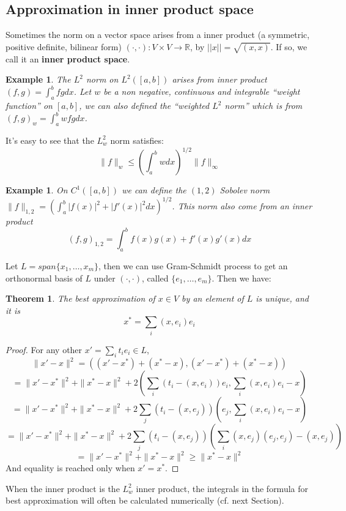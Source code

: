 \documentclass{article} %
\theoremstyle{break}
\newtheorem{exa}[definition]{Example}
\newtheorem{thm}[definition]{Theorem}
\begin{document}
\subsection{Approximation in inner product space}

Sometimes the norm on a vector space arises from a inner product (a symmetric, positive definite, bilinear form) $(\cdot, \cdot): V\times V\rightarrow \mathbb{R}$, by $||x||=\sqrt{(x, x)}$. If so, we call it an {\bf inner product space}.\\

\begin{exa}The $L^2$ norm on $L^2([a, b])$ arises from inner product $(f, g)=\int_a^b fg dx$. Let $w$ be a non negative, continuous and integrable ``weight function'' on $[a, b]$, we can also defined the ``weighted $L^2$ norm'' which is from $(f, g)_w=\int_a^bwfg dx$.\end{exa}

It's easy to see that the $L^2_w$ norm satisfies:
\[\|f\|_{w}\leq(\int_a^bwdx)^{1/2}\|f\|_\infty\]

\begin{exa}On $C^1([a, b])$ we can define the $(1, 2)$ Sobolev norm $\|f\|_{1, 2}=(\int_a^b|f(x)|^2+|f'(x)|^2dx)^{1/2}$. This norm also come from an inner product
  \[(f, g)_{1, 2}=\int_a^b f(x)g(x)+f'(x)g'(x)dx\]
\end{exa}


Let $L=span\{x_1,\dots,  x_m\}$, then we can use Gram-Schmidt process to get an orthonormal basis of $L$ under $(\cdot, \cdot)$, called $\{e_1,\dots, e_m\}$. Then we have:

\begin{thm}The best approximation of $x\in V$ by an element of $L$ is unique, and it is
  \[x^*=\sum_i(x, e_i)e_i\]
\end{thm}

\begin{proof}
  For any other $x'=\sum_i t_ie_i\in L$,
  \[\|x'-x\|^2=((x'-x^*)+(x^*-x), (x'-x^*)+(x^*-x))\]
  \[=\|x'-x^*\|^2+\|x^*-x\|^2+2(\sum_i(t_i-(x, e_i))e_i, \sum_i(x, e_i)e_i-x)\]
  \[=\|x'-x^*\|^2+\|x^*-x\|^2+2\sum_j(t_i-(x, e_j))(e_j, \sum_i(x, e_i)e_i-x)\]
  \[=\|x'-x^*\|^2+\|x^*-x\|^2+2\sum_j(t_i-(x, e_j))(\sum_i(x, e_j)(e_j, e_j)-(x, e_j))\]
  \[=\|x'-x^*\|^2+\|x^*-x\|^2\geq \|x^*-x\|^2\]
  And equality is reached only when $x'=x^*$.
\end{proof}


When the inner product is the $L^2_w$ inner product, the integrals in the formula for best approximation will often be calculated numerically (cf. next Section).\\
\end{document}
